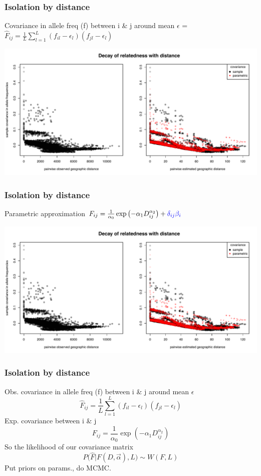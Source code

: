 \documentclass{beamer}
\begin{document}
\begin{frame}
\frametitle{Isolation by distance}
{\small Covariance in allele freq (f) between i \& j around mean $\epsilon$  =
$ \hat{F}_{ij} = \frac{1}{L} \sum_{l=1}^L (f_{il} -
\epsilon_l)(f_{jl}-\epsilon_l) $ }
	\vskip -0.5cm
	\begin{center} \includegraphics[width= 0.6 \textwidth]{../smbe_spacemix_figs/cropped_globe_sampleV} \end{center}
\end{frame}

\begin{frame}
\frametitle{Isolation by distance}
Parametric approximation {\small ${F}_{ij} = \frac{1}{\alpha_0} \exp \left(
  -\alpha_1 D_{ij}^{\alpha_2} \right) + \color{blue}{ \delta_{ij} \beta_i }$} 
	\vskip -0.5cm
	\begin{center} \includegraphics[width=  0.6 \textwidth]{../smbe_spacemix_figs/cropped_globe_sampleV} \end{center}
\end{frame}


\begin{frame}
\frametitle{Isolation by distance}
Obs. covariance in allele freq (f) between i \& j around mean $\epsilon$
\begin{equation*}
\hat{F}_{ij} = \frac{1}{L} \sum_{l=1}^L (f_{il} - \epsilon_l)(f_{jl}-\epsilon_l)
\end{equation*}
Exp. covariance between i \& j
\begin{equation*}
{F}_{ij} = \frac{1}{\alpha_0} \exp \left( -\alpha_1 D_{ij}^{\alpha_2} \right)
\end{equation*}
So the likelihood of our covariance matrix
\begin{equation*}
P \big(\hat{F} | F(D,\vec{\alpha}), L \big) \sim W(F,L)
\end{equation*}
Put priors on params., do MCMC.
\end{frame}
\end{document}
